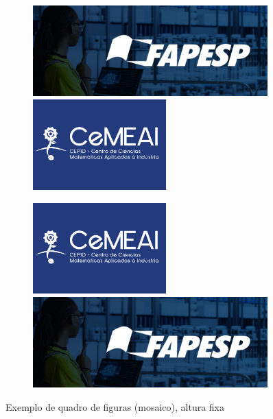 \begin{figure}[H]
    \centering
    \begin{subfigure}{\linewidth}
        \centering
        \includegraphics[height=3.5cm]{Figuras/FAPESP.jpg}
        \includegraphics[height=3.5cm]{Figuras/CEMEAI.png}
    \end{subfigure}

    \begin{subfigure}{\linewidth}
        \centering
        \includegraphics[height=3.5cm]{Figuras/CEMEAI.png}
        \includegraphics[height=3.5cm]{Figuras/FAPESP.jpg}
    \end{subfigure}
    \caption{Exemplo de quadro de figuras (mosaico), altura fixa}
    \label{fig:alturafixa1}
\end{figure}

